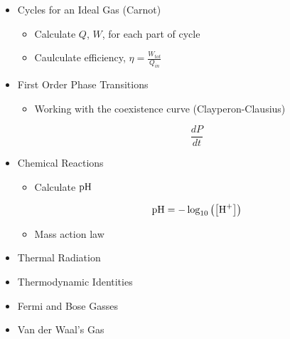 \begin{itemize}
\begin{itemize}
      \item Cycles for an Ideal Gas (Carnot)

        \begin{itemize}

          \item Calculate $Q$, $W$, for each part of cycle

          \item Caulculate efficiency, $\eta=\frac{W_{tot}}{Q_{in}}$

        \end{itemize}

      \item First Order Phase Transitions

        \begin{itemize}

          \item Working with the coexistence curve (Clayperon-Clausius)

            $$\frac{dP}{dt}$$

        \end{itemize}

      \item Chemical Reactions

        \begin{itemize}

          \item Calculate $\ce{pH}$

            $$\ce{pH}=-\log_{10}\left( \left[ \ce{H+} \right] \right)$$

          \item Mass action law

        \end{itemize}

      \item Thermal Radiation

      \item Thermodynamic Identities

      \item Fermi and Bose Gasses

      \item Van der Waal's Gas

    \end{itemize}

\end{itemize}





